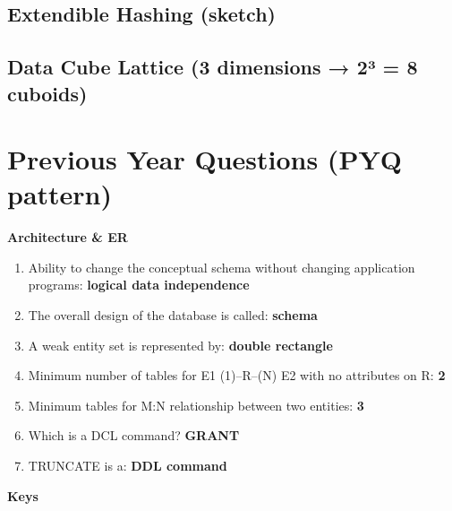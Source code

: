 

\needspace{95pt}

\hypertarget{p2-04--127-extendible-hashing-sketch}{%
\subsection{Extendible Hashing (sketch)}\label{p2-04--127-extendible-hashing-sketch}}



\needspace{95pt}

\hypertarget{p2-04--128-data-cube-lattice-3-dimensions--2uxb3--8-cuboids}{%
\subsection{Data Cube Lattice (3 dimensions → 2³ = 8 cuboids)}\label{p2-04--128-data-cube-lattice-3-dimensions--2uxb3--8-cuboids}}



\needspace{125pt}

\hypertarget{p2-04--previous-year-questions-pyq-pattern}{%
\section{Previous Year Questions (PYQ pattern)}\label{p2-04--previous-year-questions-pyq-pattern}}

\textbf{Architecture \& ER}

\begin{enumerate}
\def\labelenumi{\arabic{enumi}.}
\tightlist
\item
  Ability to change the conceptual schema without changing application programs: \textbf{logical data independence}
\item
  The overall design of the database is called: \textbf{schema}
\item
  A weak entity set is represented by: \textbf{double rectangle}
\item
  Minimum number of tables for E1 (1)--R--(N) E2 with no attributes on R: \textbf{2}
\item
  Minimum tables for M:N relationship between two entities: \textbf{3}
\item
  Which is a DCL command? \textbf{GRANT}
\item
  TRUNCATE is a: \textbf{DDL command}
\end{enumerate}

\textbf{Keys}

